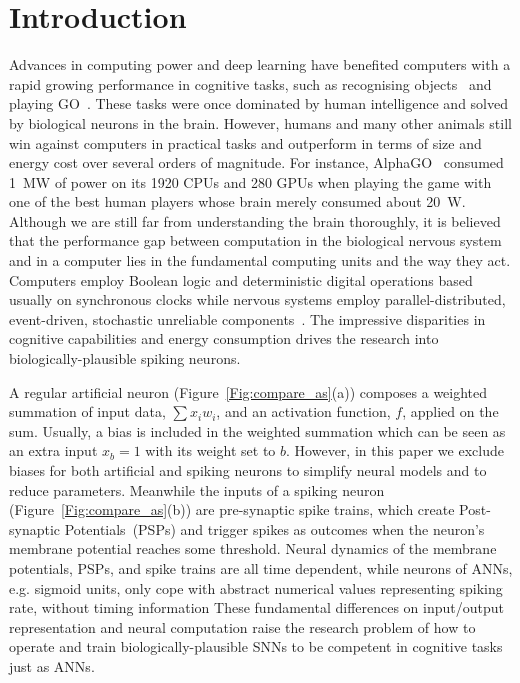 \documentclass{article}
\begin{document}
\section{Introduction}
Advances in computing power and deep learning have benefited computers with a rapid growing performance in cognitive tasks, such as recognising objects~\cite{deng2009imagenet} and playing GO~\cite{silver2016mastering}. 
These tasks were once dominated by human intelligence and solved by biological neurons in the brain.
However, humans and many other animals still win against computers in practical tasks and outperform in terms of size and energy cost over several orders of magnitude.
For instance, AlphaGO~\cite{silver2016mastering} consumed 1~MW of power on its 1920 CPUs and 280 GPUs when playing the game with one of the best human players whose brain merely consumed about 20~W.
Although we are still far from understanding the brain thoroughly, it is believed that the performance gap between computation in the biological nervous system and in a computer lies in the fundamental computing units and the way they act.
Computers employ Boolean logic and deterministic digital operations based usually on synchronous clocks while nervous systems employ parallel-distributed, event-driven, stochastic unreliable components~\cite{indiveri2009artificial}.
The impressive disparities in cognitive capabilities and energy consumption drives the research into biologically-plausible spiking neurons.

A regular artificial neuron (Figure~\ref{Fig:compare_as}(a)) composes a weighted summation of input data, $\sum x_i w_i$, and an activation function, $f$, applied on the sum.
Usually, a bias is included in the weighted summation which can be seen as an extra input $x_b = 1$ with its weight set to $b$.
However, in this paper we exclude biases for both artificial and spiking neurons to simplify neural models and to reduce parameters.
Meanwhile the inputs of a spiking neuron (Figure~\ref{Fig:compare_as}(b)) are pre-synaptic spike trains, which create Post-synaptic Potentials~(PSPs) and trigger spikes as outcomes when the neuron's membrane potential reaches some threshold.
Neural dynamics of the membrane potentials, PSPs, and spike trains are all time dependent, while neurons of ANNs, e.g. sigmoid units, only cope with abstract numerical values representing spiking rate, without timing information
These fundamental differences on input/output representation and neural computation raise the research problem of how to operate and train biologically-plausible SNNs to be competent in cognitive tasks just as ANNs.
\end{document}

